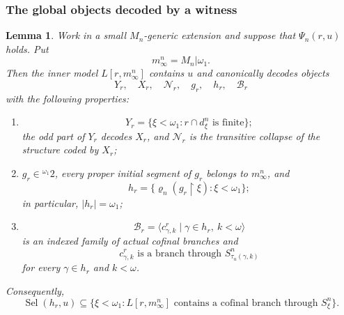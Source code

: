 \documentclass[a4paper,11pt]{article}
\newtheorem{lemma}[theorem]{Lemma}
\begin{document}
\subsubsection*{The global objects decoded by a witness}

\begin{lemma}
\label{lemma-inner-model-decoded-by-Phi-Mn}
Work in a small $M_n$-generic extension and suppose that
$\Psi_n(r,u)$ holds.  Put
\[
   m^n_\infty=M_n|\omega_1.
\]
Then the inner model $L[r,m^n_\infty]$ contains $u$ and canonically decodes
objects
\[
   Y_r,\quad X_r,\quad \mathcal N_r,
   \quad g_r,\quad h_r,\quad \mathcal B_r
\]
with the following properties:
\begin{enumerate}
   \item
   \[
      Y_r
      =\{\xi<\omega_1:
         r\cap d^n_\xi\text{ is finite}\};
   \]
   the odd part of $Y_r$ decodes $X_r$, and $\mathcal N_r$ is the
   transitive collapse of the structure coded by $X_r$;

   \item $g_r\in{}^{\omega_1}2$, every proper initial segment of $g_r$
   belongs to $m^n_\infty$, and
   \[
      h_r
      =\{\varrho_n(g_r\restriction\xi):
           \xi<\omega_1\};
   \]
   in particular, $|h_r|=\omega_1$;

   \item
   \[
      \mathcal B_r
      =\langle c^r_{\gamma,k}
         \mid\gamma\in h_r,\ k<\omega\rangle
   \]
   is an indexed family of actual cofinal branches and
   \[
      c^r_{\gamma,k}
      \text{ is a branch through }
      S^n_{\tau_u(\gamma,k)}
   \]
   for every $\gamma\in h_r$ and $k<\omega$.
\end{enumerate}
Consequently,
\[
   \operatorname{Sel}(h_r,u)
   \subseteq
   \{\xi<\omega_1:
      L[r,m^n_\infty]
      \text{ contains a cofinal branch through }S^n_\xi\}.
\]
\end{lemma}
\end{document}
